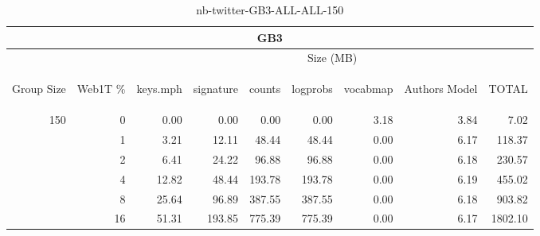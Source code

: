 \begin{center}
\begin{table}[htbp]
\begin{tabular}{ | r | r | r | r | r | r | r | r | r |}
\hline
\multicolumn{9}{|c|}{GB3}\\
\hline
 & & \multicolumn{7}{|c|}{Size (MB)}\\ \cline{3-9}
\begin{sideways}Group Size\end{sideways} & \begin{sideways}Web1T \% \end{sideways} & \begin{sideways}keys.mph\end{sideways} & \begin{sideways}signature\end{sideways} & \begin{sideways}counts\end{sideways} & \begin{sideways}logprobs\end{sideways} & \begin{sideways}vocabmap\end{sideways} & \begin{sideways}Authors Model \end{sideways} & \begin{sideways}TOTAL\end{sideways}\\
\hline
\multirow{5}{*}{150}
 & 0 & 0.00 & 0.00 & 0.00 & 0.00 & 3.18 & 3.84 & 7.02\\ \cline{2-9}
 & 1 & 3.21 & 12.11 & 48.44 & 48.44 & 0.00 & 6.17 & 118.37\\ \cline{2-9}
 & 2 & 6.41 & 24.22 & 96.88 & 96.88 & 0.00 & 6.18 & 230.57\\ \cline{2-9}
 & 4 & 12.82 & 48.44 & 193.78 & 193.78 & 0.00 & 6.19 & 455.02\\ \cline{2-9}
 & 8 & 25.64 & 96.89 & 387.55 & 387.55 & 0.00 & 6.18 & 903.82\\ \cline{2-9}
 & 16 & 51.31 & 193.85 & 775.39 & 775.39 & 0.00 & 6.17 & 1802.10\\ \cline{2-9}
\hline
\end{tabular}
\caption{nb-twitter-GB3-ALL-ALL-150}
\label{table:nb-twitter-GB3-ALL-ALL-150}
\end{table}
\end{center}

